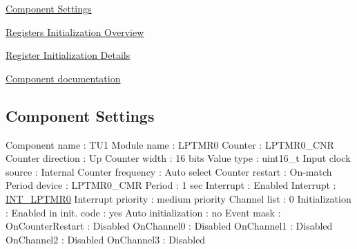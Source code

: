 \begin{DoxyItemize}
\item \hyperlink{TU1_settings}{Component Settings}
\item \hyperlink{TU1_regs_overview}{Registers Initialization Overview}
\item \hyperlink{TU1_regs_details}{Register Initialization Details}
\item \hyperlink{group___t_u1__module}{Component documentation} 
\end{DoxyItemize}\hypertarget{TU1_settings}{}\subsection{Component Settings}\label{TU1_settings}

\begin{DoxyCode}
            Component name                                 : TU1
            Module name                                    : LPTMR0
            Counter                                        : LPTMR0\_CNR
            Counter direction                              : Up
            Counter width                                  : 16 bits
            Value type                                     : uint16\_t
            Input clock source                             : Internal
              Counter frequency                            : Auto select
            Counter restart                                : On-match
              Period device                                : LPTMR0\_CMR
              Period                                       : 1 sec
              Interrupt                                    : Enabled
                Interrupt                                  : \hyperlink{group___interrupt__vector__numbers_gga5f3656e2a154b64aa378a2f3856c3a8dadb33151c23fc4df6fa87f60d1df02dae}{INT\_LPTMR0}
                Interrupt priority                         : medium priority
            Channel list                                   : 0
            Initialization                                 : 
              Enabled in init. code                        : yes
              Auto initialization                          : no
              Event mask                                   : 
                OnCounterRestart                           : Disabled
                OnChannel0                                 : Disabled
                OnChannel1                                 : Disabled
                OnChannel2                                 : Disabled
                OnChannel3                                 : Disabled

\end{DoxyCode}
